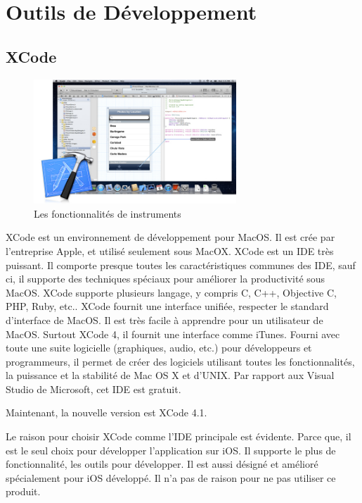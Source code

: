 
\section{Outils de Développement} %
\label{sec:outils_de_développement}

\subsection{XCode} %
\label{sub:xcode}

\begin{figure}[htbp]
	\centering
		\includegraphics[width=3in]{Image/tools_overview_xcode_20110711.jpg}
	\caption{Les fonctionnalités de instruments}
	\label{fig:Image_tools_overview_xcode_20110711}
\end{figure}

XCode est un environnement de développement pour MacOS. Il est crée par l'entreprise Apple, et utilisé seulement sous MacOX. XCode est un IDE très puissant. Il comporte presque toutes les caractéristiques communes des IDE, sauf ci, il supporte des techniques spéciaux pour améliorer la productivité sous MacOS. XCode supporte plusieurs langage, y compris C, C++, Objective C, PHP, Ruby, etc.. XCode fournit une interface unifiée, respecter le standard d'interface de MacOS. Il est très facile à apprendre pour un utilisateur de MacOS. Surtout XCode 4, il fournit une interface comme iTunes. Fourni avec toute une suite logicielle (graphiques, audio, etc.) pour développeurs et programmeurs, il permet de créer des logiciels utilisant toutes les fonctionnalités, la puissance et la stabilité de Mac OS X et d'UNIX. Par rapport aux Visual Studio de Microsoft, cet IDE est gratuit.

Maintenant, la nouvelle version est XCode 4.1. 

Le raison pour choisir XCode comme l'IDE principale est évidente. Parce que, il est le seul choix pour développer l'application sur iOS. Il supporte le plus de fonctionnalité, les outils pour développer. Il est aussi désigné et amélioré spécialement pour iOS développé. Il n'a pas de raison pour ne pas utiliser ce produit.

